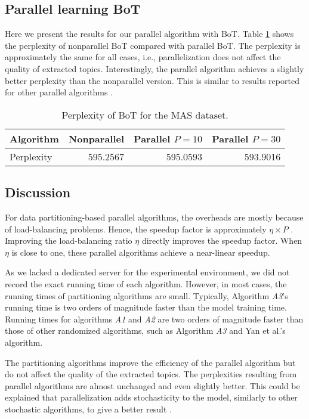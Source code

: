 \documentclass[10pt,conference]{IEEEtran}
\begin{document}
\subsection{Parallel learning BoT}
Here we present the results for our parallel algorithm with BoT. Table \ref{tab:bot} shows the perplexity of nonparallel BoT compared with parallel BoT. The perplexity is approximately the same for all cases, i.e., parallelization does not affect the quality of extracted topics. Interestingly, the parallel algorithm achieves a slightly better perplexity than the nonparallel version. This is similar to results reported for other parallel algorithms \cite{newman2007distributed,ihler2012understanding}.

\begin{table}[htbp]
  \centering
  \caption{Perplexity of BoT for the MAS dataset.}
    \begin{tabular}{l|r|r|r}
    \hline
    Algorithm & Nonparallel & Parallel $P=10$ & Parallel $P=30$ \\
    \hline
    Perplexity & 595.2567 & 595.0593 & 593.9016 \\
    \hline
    \end{tabular}\label{tab:bot}\end{table}
\subsection{Discussion}
For data partitioning-based parallel algorithms, the overheads are mostly because of load-balancing problems. Hence, the speedup factor is approximately $\eta \times P$ \cite{yan2009parallel}. Improving the load-balancing ratio $\eta$ directly improves the speedup factor. When $\eta$ is close to one, these parallel algorithms achieve a near-linear speedup.

As we lacked a dedicated server for the experimental environment, we did not record the exact running time of each algorithm. However, in most cases, the running times of partitioning algorithms are small. Typically, Algorithm \textit{A3}'s running time is two orders of magnitude faster than the model training time. Running times for algorithms \textit{A1} and \textit{A2} are two orders of magnitude faster than those of other randomized algorithms, such as Algorithm \textit{A3} and Yan et al.'s algorithm.

The partitioning algorithms improve the efficiency of the parallel algorithm but do not affect the quality of the extracted topics. The perplexities resulting from parallel algorithms are almost unchanged and even slightly better. This could be explained that parallelization adds stochasticity to the model, similarly to other stochastic algorithms, to give a better result \cite{ihler2012understanding,recht2011hogwild}.
\end{document}

